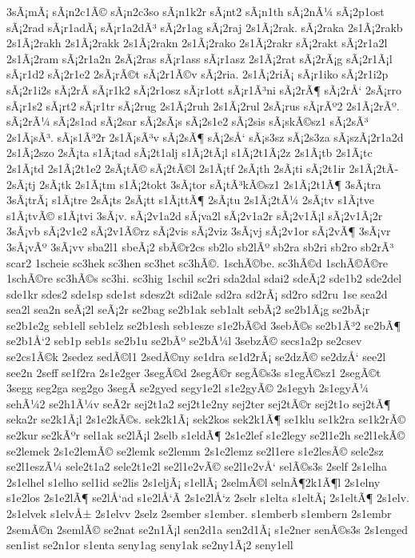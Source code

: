 {3sÃ¡mÃ¡
sÃ¡n2c1Ã©
sÃ¡n2c3so
sÃ¡n1k2r
sÃ¡nt2
sÃ¡n1th
sÃ¡2nÃ¼
sÃ¡2p1ost
sÃ¡2rad
sÃ¡r1adÃ¡
sÃ¡r1a2dÃ³
sÃ¡2r1ag
sÃ¡2raj
2s1Ã¡2rak.
sÃ¡2raka
2s1Ã¡2rakb
2s1Ã¡2rakh
2s1Ã¡2rakk
2s1Ã¡2rakn
2s1Ã¡2rako
2s1Ã¡2rakr
sÃ¡2rakt
sÃ¡2r1a2l
2s1Ã¡2ram
sÃ¡2r1a2n
2sÃ¡2ras
sÃ¡r1ass
sÃ¡r1asz
2s1Ã¡2rat
sÃ¡2rÃ¡g
sÃ¡2r1Ã¡l
sÃ¡r1d2
sÃ¡2r1e2
2sÃ¡rÃ©t
sÃ¡2r1Ã©v
sÃ¡2ria.
2s1Ã¡2riÃ¡
sÃ¡r1iko
sÃ¡2r1i2p
sÃ¡2r1i2s
sÃ¡2rÃ­
sÃ¡r1k2
sÃ¡2r1osz
sÃ¡r1ott
sÃ¡r1Ã³ni
sÃ¡2rÃ¶
sÃ¡2rÅ‘
2sÃ¡rro
sÃ¡r1s2
sÃ¡rt2
sÃ¡r1tr
sÃ¡2rug
2s1Ã¡2ruh
2s1Ã¡2rul
2sÃ¡rus
sÃ¡rÃº2
2s1Ã¡2rÃº.
sÃ¡2rÃ¼
sÃ¡2s1ad
sÃ¡2sar
sÃ¡2sÃ¡s
sÃ¡2s1e2
sÃ¡2sis
sÃ¡skÃ©sz1
sÃ¡2sÃ³
2s1Ã¡sÃ³.
sÃ¡s1Ã³2r
2s1Ã¡sÃ³v
sÃ¡2sÃ¶
sÃ¡2sÅ‘
sÃ¡s3sz
sÃ¡2s3za
sÃ¡szÃ¡2r1a2d
2s1Ã¡2szo
2sÃ¡ta
s1Ã¡tad
sÃ¡2t1alj
s1Ã¡2tÃ¡l
s1Ã¡2t1Ã¡2z
2s1Ã¡tb
2s1Ã¡tc
2s1Ã¡td
2s1Ã¡2t1e2
2sÃ¡tÃ©
sÃ¡2tÃ©l
2s1Ã¡tf
2sÃ¡th
2sÃ¡ti
sÃ¡2t1ir
2s1Ã¡2tÃ­
2sÃ¡tj
2sÃ¡tk
2s1Ã¡tm
s1Ã¡2tokt
3sÃ¡tor
sÃ¡tÃ³kÃ©sz1
2s1Ã¡2t1Ã¶
3sÃ¡tra
3sÃ¡trÃ¡
s1Ã¡tre
2sÃ¡ts
2sÃ¡tt
s1Ã¡ttÃ¶
2sÃ¡tu
2s1Ã¡2tÃ¼
2sÃ¡tv
s1Ã¡tve
s1Ã¡tvÃ©
s1Ã¡tvi
3sÃ¡v.
sÃ¡2v1a2d
sÃ¡va2l
sÃ¡2v1a2r
sÃ¡2v1Ã¡l
sÃ¡2v1Ã¡2r
3sÃ¡vb
sÃ¡2v1e2
sÃ¡2v1Ã©rz
sÃ¡2vis
sÃ¡2viz
3sÃ¡vj
sÃ¡2v1or
sÃ¡2vÃ¶
3sÃ¡vr
3sÃ¡vÃº
3sÃ¡vv
sba2l1
sbeÃ¡2
sbÃ©r2cs
sb2lo
sb2lÃº
sb2ra
sb2ri
sb2ro
sb2rÃ³
scar2
1scheie
sc3hek
sc3hen
sc3het
sc3hÃ©.
1schÃ©be.
sc3hÃ©d
1schÃ©Ã©re
1schÃ©re
sc3hÃ©s
sc3hi.
sc3hig
1schil
sc2ri
sda2dal
sdai2
sdeÃ¡2
sde1b2
sde2del
sde1kr
sdes2
sde1sp
sde1st
sdesz2t
sdi2ale
sd2ra
sd2rÃ¡
sd2ro
sd2ru
1se
sea2d
sea2l
sea2n
seÃ¡2l
seÃ¡2r
se2bag
se2b1ak
seb1alt
sebÃ¡2
se2b1Ã¡g
se2bÃ¡r
se2b1e2g
seb1ell
seb1elz
se2b1esh
seb1esze
s1e2bÃ©d
3sebÃ©s
se2b1Ã³2
se2bÃ¶
se2b1Å‘2
seb1p
seb1s
se2b1u
se2bÃº
se2bÃ¼l
3sebzÃ©
secs1a2p
se2csev
se2cs1Ã©k
2sedez
sedÃ©l1
2sedÃ©ny
se1dra
se1d2rÃ¡
se2dzÃ©
se2dzÅ‘
see2l
see2n
2seff
se1f2ra
2s1e2ger
3segÃ©d
2segÃ©r
segÃ©s3s
s1egÃ©sz1
2segÃ©t
3segg
seg2ga
seg2go
3segÃ­
se2gyed
segy1e2l
s1e2gyÃ©
2s1egyh
2s1egyÃ¼
sehÃ¼2
se2h1Ã¼v
seÃ­2r
sej2t1a2
sej2t1e2ny
sej2ter
sej2tÃ©r
sej2t1o
sej2tÃ¶
seka2r
se2k1Ã¡l
2s1e2kÃ©s.
sek2k1Ã¡
sek2kos
sek2k1Ã¶
se1klu
se1k2ra
se1k2rÃ©
se2kur
se2kÃºr
sel1ak
se2lÃ¡l
2selb
s1eldÃ¶
2s1e2lef
s1e2legy
se2l1e2h
se2l1ekÃ©
se2lemek
2s1e2lemÃ©
se2lemk
se2lemm
2s1e2lemz
se2l1ere
s1e2lesÃ©
sele2sz
se2l1eszÃ¼
sele2t1a2
sele2t1e2l
se2l1e2vÃ©
se2l1e2vÅ‘
selÃ©s3s
2self
2s1elha
2s1elhel
s1elho
sel1id
se2lis
2s1eljÃ¡
s1ellÃ¡
2selmÃ©l
selnÃ¶2k1Ã¶l
2s1elny
s1e2los
2s1e2lÃ¶
se2lÅ‘ad
s1e2lÅ‘Ã­
2s1e2lÅ‘z
2selr
s1elta
s1eltÃ¡
2s1eltÃ¶
2s1elv.
2s1elvek
s1elvÅ±
2s1elvv
2selz
2sember
s1ember.
s1emberb
s1embern
2s1embr
2semÃ©n
2semlÃ©
se2nat
se2n1Ã¡l
sen2d1a
sen2d1Ã¡
s1e2ner
senÃ©s3s
2s1enged
sen1ist
se2n1or
s1enta
seny1ag
seny1ak
se2ny1Ã¡2
seny1ell
}
